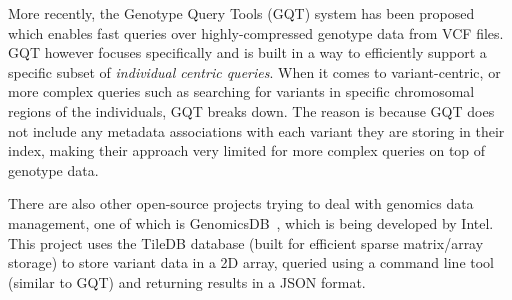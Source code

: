 \documentclass[conference,twocolumn,10pt]{IEEEtran}
\begin{document}
More recently, the Genotype Query Tools (GQT) \cite{layer2016efficient} system has been proposed which enables fast queries over highly-compressed genotype data from VCF files. GQT however focuses specifically and is built in a way to efficiently support a specific subset of \textit{individual centric queries}. When it comes to variant-centric, or more complex queries such as searching for variants in specific chromosomal regions of the individuals, GQT breaks down. The reason is because GQT does not include any metadata associations with each variant they are storing in their index, making their approach very limited for more complex queries on top of genotype data.

There are also other open-source projects trying to deal with genomics data management, one of which is GenomicsDB~\cite{genomicsdb}, which is being developed by Intel. This project uses the TileDB database (built for efficient sparse matrix/array storage) to store variant data in a 2D array, queried using a command line tool (similar to GQT) and returning results in a JSON format.


\end{document}
